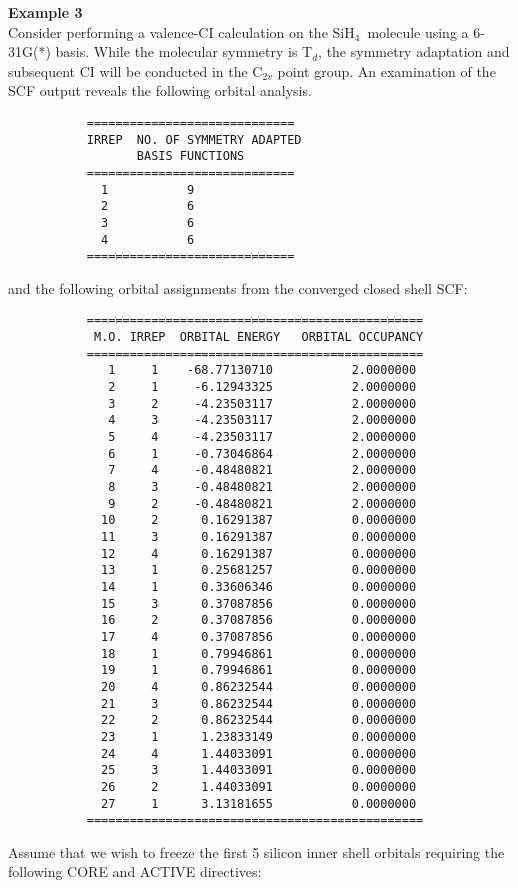 \documentclass[11pt,fleqn]{article}
\newcommand{\silane}{\mbox{SiH$_{4}$}}
\begin{document}
{\bf Example 3}\\

Consider performing a valence-CI calculation on the \silane\ molecule
using a 6-31G(*)  basis. While the molecular symmetry is T$_{d}$, the
symmetry adaptation  and subsequent CI will be conducted in the C$_{2v}$
point group. An examination of the SCF output reveals the following
orbital analysis.

{
\footnotesize
\begin{verbatim}
           =============================
           IRREP  NO. OF SYMMETRY ADAPTED
                  BASIS FUNCTIONS
           =============================
             1           9
             2           6
             3           6
             4           6
           =============================
\end{verbatim}
}
and the following orbital assignments from
the converged closed shell SCF:
{
\footnotesize
\begin{verbatim}
           ===============================================
            M.O. IRREP  ORBITAL ENERGY   ORBITAL OCCUPANCY
           ===============================================
              1     1    -68.77130710           2.0000000
              2     1     -6.12943325           2.0000000
              3     2     -4.23503117           2.0000000
              4     3     -4.23503117           2.0000000
              5     4     -4.23503117           2.0000000
              6     1     -0.73046864           2.0000000
              7     4     -0.48480821           2.0000000
              8     3     -0.48480821           2.0000000
              9     2     -0.48480821           2.0000000
             10     2      0.16291387           0.0000000
             11     3      0.16291387           0.0000000
             12     4      0.16291387           0.0000000
             13     1      0.25681257           0.0000000
             14     1      0.33606346           0.0000000
             15     3      0.37087856           0.0000000
             16     2      0.37087856           0.0000000
             17     4      0.37087856           0.0000000
             18     1      0.79946861           0.0000000
             19     1      0.79946861           0.0000000
             20     4      0.86232544           0.0000000
             21     3      0.86232544           0.0000000
             22     2      0.86232544           0.0000000
             23     1      1.23833149           0.0000000
             24     4      1.44033091           0.0000000
             25     3      1.44033091           0.0000000
             26     2      1.44033091           0.0000000
             27     1      3.13181655           0.0000000
           ===============================================
\end{verbatim}
}
Assume that we wish to freeze the first 5 silicon inner shell orbitals
requiring the following CORE and ACTIVE directives:
\end{document}
